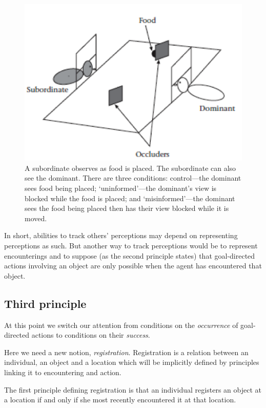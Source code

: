\documentclass[12pt,\papersize]{extarticle}
\begin{document}
\begin{figure}
\begin{center}
\includegraphics{figure_hare_food_perception.png}
\caption{
	\label{figure:hare_food_perception}
	A subordinate observes as food is placed.  The subordinate can also see the dominant.  There are three conditions: control—the dominant sees food being placed; `uninformed'—the dominant’s view is blocked while the food is placed; and `misinformed'—the dominant sees the food being placed then  has their view blocked while it is moved.
	 \citep[Source:][pp.\ 142, fig. 1]{en_1545}
}
\end{center}
\end{figure}


In short, 
abilities to track others' perceptions  may depend on representing perceptions as such.
But another way to track perceptions would be to represent encounterings and to suppose (as the second principle states) that goal-directed actions involving an object are only possible when the agent has encountered that object.


\subsection{Third principle}

At this point we switch our attention from conditions on the \textit{occurrence} of goal-directed actions to conditions on their \textit{success}. 

Here we need a new notion, \textit{registration}.  Registration is a relation between an individual, an object and a location which will be implicitly defined by principles linking it to encountering and action.  

The first  principle defining registration is that an individual registers an object at a location if and only if she most recently encountered it at that location.  
\end{document}
